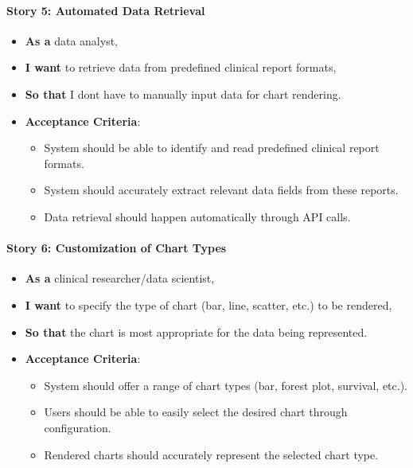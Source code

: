 \paragraph{Story 5: Automated Data
Retrieval}\label{story-5-automated-data-retrieval}

\begin{itemize}
\item
  \textbf{As a} data analyst,
\item
  \textbf{I want} to retrieve data from predefined
  clinical report formats,
\item
  \textbf{So that} I don\textquotesingle t have to manually input data
  for chart rendering.
\item
  \textbf{Acceptance Criteria}:

  \begin{itemize}
  \item
    System should be able to identify and read predefined clinical
    report formats.
  \item
    System should accurately extract relevant data fields from these
    reports.
  \item
    Data retrieval should happen automatically through API calls.
  \end{itemize}
\end{itemize}

\paragraph{Story 6: Customization of Chart
Types}\label{story-6-customization-of-chart-types}

\begin{itemize}
\item
  \textbf{As a} clinical researcher/data scientist,
\item
  \textbf{I want} to specify the type of chart (bar, line, scatter,
  etc.) to be rendered,
\item
  \textbf{So that} the chart is most appropriate for the data being
  represented.
\item
  \textbf{Acceptance Criteria}:

  \begin{itemize}
  \item
    System should offer a range of chart types (bar, forest plot,
    survival, etc.).
  \item
    Users should be able to easily select the desired chart through
    configuration.
  \item
    Rendered charts should accurately represent the selected chart type.
  \end{itemize}
\end{itemize}

